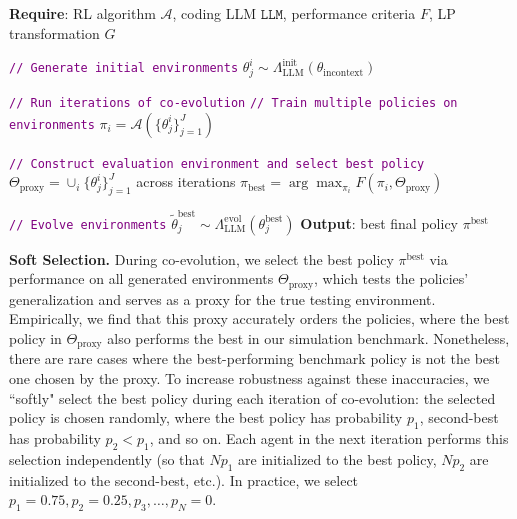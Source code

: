 \documentclass{article}
\begin{document}
\begin{algorithm}[H]
\caption{Eurekaverse}
\label{algo:env-gen}
\begin{algorithmic}[1]
\small
\STATE \textbf{Require}: RL algorithm $\mathcal{A}$, coding LLM $\texttt{LLM}$, performance criteria $F$, LP transformation $G$

\STATE \textcolor{purple}{\texttt{// Generate initial environments}}
\STATE $\theta^i_j\sim\Lambda_{\text{LLM}}^{\text{init}}(\theta_{\text{incontext}})$

\STATE \textcolor{purple}{\texttt{// Run iterations of co-evolution}}
    \STATE \textcolor{purple}{\texttt{// Train multiple policies on environments}}
        \STATE $\pi_i = \mathcal{A}(\{\theta^i_j\}_{j=1}^J)$
    \ENDFOR

    \STATE \textcolor{purple}{\texttt{// Construct evaluation environment and select best policy}}
    \STATE $\Theta_{\text{proxy}} = \cup_i \{\theta^i_j\}_{j=1}^J$ across iterations
    \STATE $\pi_{\text{best}} = \arg\max_{\pi_i} F(\pi_i, \Theta_{\text{proxy}})$
    
    \STATE \textcolor{purple}{\texttt{// Evolve environments}}
    \STATE $\tilde\theta^{\text{best}}_j \sim \Lambda_{\text{LLM}}^{\text{evol}}\left(\theta^{\text{best}}_j\right)$
\ENDFOR
\STATE \textbf{Output}: best final policy $\pi^\text{best}$
\end{algorithmic}
\end{algorithm}

\textbf{Soft Selection.} During co-evolution, we select the best policy $\pi^{\text{best}}$ via performance on all generated environments $\Theta_{\text{proxy}}$, which tests the policies' generalization and serves as a proxy for the true testing environment. Empirically, we find that this proxy accurately orders the policies, where the best policy in $\Theta_{\text{proxy}}$ also performs the best in our simulation benchmark. Nonetheless, there are rare cases where the best-performing benchmark policy is not the best one chosen by the proxy. To increase robustness against these inaccuracies, we ``softly" select the best policy during each iteration of co-evolution: the selected policy is chosen randomly, where the best policy has probability $p_1$, second-best has probability $p_2 < p_1$, and so on. Each agent in the next iteration performs this selection independently (so that $Np_1$ are initialized to the best policy, $Np_2$ are initialized to the second-best, etc.). In practice, we select $p_1 = 0.75, p_2 = 0.25, p_3, \ldots, p_N = 0$.
\end{document}

